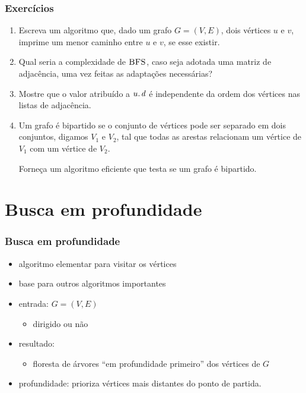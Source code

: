 \documentclass{beamer}
\begin{document}
\begin{frame}
\frametitle{Exercícios}
\begin{enumerate}
\item Escreva um algoritmo que, dado um grafo $G=(V, E)$, dois vértices $u$ e
  $v$, imprime um menor caminho entre $u$ e $v$, se esse existir.
\item Qual seria a complexidade de $\textnormal{\scshape BFS}$, caso seja adotada uma matriz de
  adjacência, uma vez feitas as adaptações necessárias?
\item Mostre que o valor atribuído a $\attrib{u}{d}$ é independente da ordem dos
  vértices nas listas de adjacência.
\item Um grafo é bipartido se o conjunto de vértices pode ser separado em dois
  conjuntos, digamos $V_1$ e $V_2$, tal que todas as arestas relacionam um
  vértice de $V_1$ com um vértice de $V_2$.

  Forneça um algoritmo eficiente que testa se um grafo é bipartido.
\end{enumerate}
\end{frame}

\section{Busca em profundidade}

\begin{frame}
\frametitle{Busca em profundidade}

\begin{itemize}
\item algoritmo elementar para visitar os vértices
\item base para outros algoritmos importantes
\item entrada: $G = (V, E)$
\begin{itemize}
\item dirigido ou não
\end{itemize}
\item resultado:
\begin{itemize}
\item floresta de árvores ``em profundidade primeiro'' dos vértices de $G$
\end{itemize}
\item \alert{profundidade}: prioriza vértices mais distantes do ponto de partida.
\end{itemize}
\end{frame}
\end{document}
